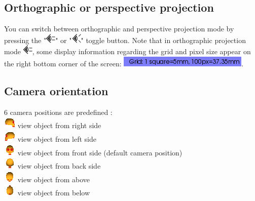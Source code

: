  
\subsection{Orthographic or perspective projection}
You can switch between orthographic and perspective projection mode by pressing the "\includegraphics[scale=0.7]{images/06/camera/camera_ortho.png}" or "\includegraphics[scale=0.7]{images/06/camera/camera_persp}" toggle button.
Note that in orthographic projection mode \includegraphics[scale=0.7]{images/06/camera/camera_ortho.png}, some display information regarding the grid and pixel size appear on the right bottom corner of the screen: \includegraphics[scale=0.7]{images/06/camera/grid_infos.png}. 


\subsection{Camera orientation}
6 camera positions are predefined :\\
\includegraphics[scale=0.7]{images/06/camera/camera_right.png} view object from right side \\
\includegraphics[scale=0.7]{images/06/camera/camera_left.png} view object from left side\\
\includegraphics[scale=0.7]{images/06/camera/camera_front.png} view object from front side (default camera position)\\
\includegraphics[scale=0.7]{images/06/camera/camera_back.png} view object from back side\\
\includegraphics[scale=0.7]{images/06/camera/camera_above.png} view object from above\\
\includegraphics[scale=0.7]{images/06/camera/camera_below.png} view object from below\\

